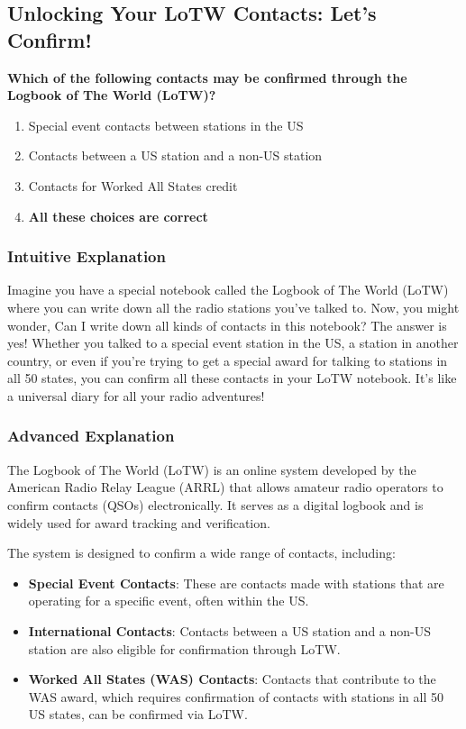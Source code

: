 \subsection{Unlocking Your LoTW Contacts: Let's Confirm!}

\begin{tcolorbox}[colback=gray!10!white,colframe=black!75!black,title=\textbf{E2C08}]
\textbf{Which of the following contacts may be confirmed through the Logbook of The World (LoTW)?}
\begin{enumerate}[label=\Alph*.]
    \item Special event contacts between stations in the US
    \item Contacts between a US station and a non-US station
    \item Contacts for Worked All States credit
    \item \textbf{All these choices are correct}
\end{enumerate}
\end{tcolorbox}

\subsubsection{Intuitive Explanation}
Imagine you have a special notebook called the Logbook of The World (LoTW) where you can write down all the radio stations you've talked to. Now, you might wonder, Can I write down all kinds of contacts in this notebook? The answer is yes! Whether you talked to a special event station in the US, a station in another country, or even if you're trying to get a special award for talking to stations in all 50 states, you can confirm all these contacts in your LoTW notebook. It's like a universal diary for all your radio adventures!

\subsubsection{Advanced Explanation}
The Logbook of The World (LoTW) is an online system developed by the American Radio Relay League (ARRL) that allows amateur radio operators to confirm contacts (QSOs) electronically. It serves as a digital logbook and is widely used for award tracking and verification. 

The system is designed to confirm a wide range of contacts, including:
\begin{itemize}
    \item \textbf{Special Event Contacts}: These are contacts made with stations that are operating for a specific event, often within the US.
    \item \textbf{International Contacts}: Contacts between a US station and a non-US station are also eligible for confirmation through LoTW.
    \item \textbf{Worked All States (WAS) Contacts}: Contacts that contribute to the WAS award, which requires confirmation of contacts with stations in all 50 US states, can be confirmed via LoTW.
\end{itemize}

